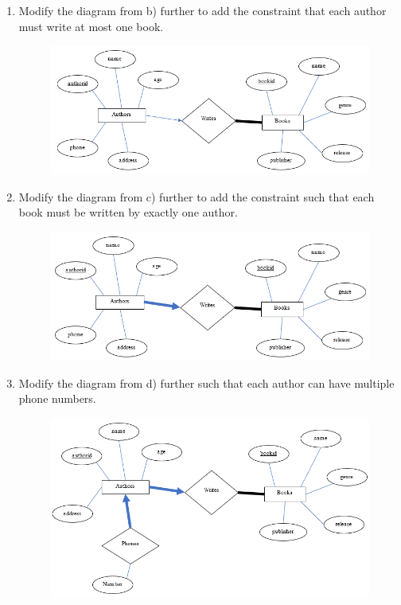 \documentclass[letterpaper, 11pt]{article}
\begin{document}
\begin{enumerate}[label={\alph*})]
\begin{figure}[H]
    \end{figure}
    \item Modify the diagram from b) further to add the constraint that each author must write at most one book.
    \begin{figure}[H]
        \centering
        \includegraphics[scale=0.7]{hw2-1c.png}
    \end{figure}
    \item Modify the diagram from c) further to add the constraint such that each book must be written by exactly one author.
    \begin{figure}[H]
        \centering
        \includegraphics[scale=0.7]{hw2-1d.png}
    \end{figure}
    \item Modify the diagram from d) further such that each author can have multiple phone numbers.
    \begin{figure}[H]
        \centering
        \includegraphics[scale=0.7]{hw2-1e.png}

\end{figure}
\end{enumerate}
\end{document}

